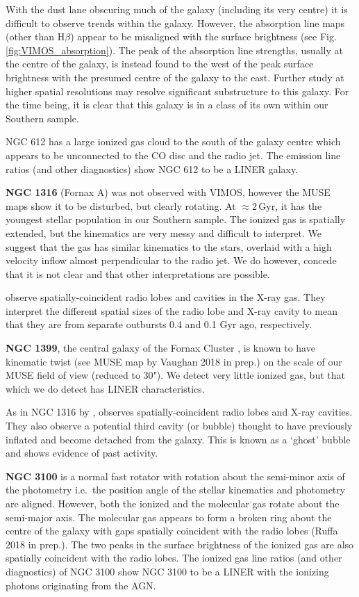 With the dust lane obscuring much of the galaxy (including its very centre) it is difficult to observe trends within the galaxy. However, the absorption line maps (other than H$\beta$) appear to be misaligned with the surface brightness (see Fig.\,\ref{fig:VIMOS_absorption}). The peak of the absorption line strengths, usually at the centre of the galaxy, is instead found to the west of the peak surface brightness with the presumed centre of the galaxy to the east. Further study at higher spatial resolutions may resolve significant substructure to this galaxy. For the time being, it is clear that this galaxy is in a class of its own within our Southern sample. 

NGC 612 has a large ionized gas cloud to the south of the galaxy centre which appears to be unconnected to the CO disc and the radio jet. The emission line ratios (and other diagnostics) show NGC 612 to be a LINER galaxy. 

\textbf{NGC 1316} (Fornax A) was not observed with VIMOS, however the MUSE maps show it to be disturbed, but clearly rotating. At $\approx 2$\,Gyr, it has the youngest stellar population in our Southern sample. The ionized gas is spatially extended, but the kinematics are very messy and difficult to interpret. We suggest that the gas has similar kinematics to the stars, overlaid with a high velocity inflow almost perpendicular to the radio jet. We do however, concede that it is not clear and that other interpretations are possible. 

\citet{Lanz2010} observe spatially-coincident radio lobes and cavities in the X-ray gas. They interpret the different spatial sizes of the radio lobe and X-ray cavity to mean that they are from separate outbursts 0.4 and 0.1 Gyr ago, respectively.

\textbf{NGC 1399}, the central galaxy of the Fornax Cluster \citep{Jordan2007}, is known to have kinematic twist (see MUSE map by Vaughan 2018 in prep.) on the scale of our MUSE field of view (reduced to 30"). We detect very little ionized gas, but that which we do detect has LINER characteristics. 

As in NGC 1316 by \citet{Lanz2010}, \citet{Su2017} observes spatially-coincident radio lobes and X-ray cavities. They also observe a potential third cavity (or bubble) thought to have previously inflated and become detached from the galaxy. This is known as a `ghost' bubble and shows evidence of past activity.

\textbf{NGC 3100} is a normal fast rotator with rotation about the semi-minor axis of the photometry i.e.\ the position angle of the stellar kinematics and photometry are aligned. However, both the ionized and the molecular gas rotate about the semi-major axis. The molecular gas appears to form a broken ring about the centre of the galaxy with gaps spatially coincident with the radio lobes (Ruffa 2018 in prep.). The two peaks in the surface brightness of the ionized gas are also spatially coincident with the radio lobes. The ionized gas line ratios (and other diagnostics) of NGC 3100 show NGC 3100 to be a LINER with the ionizing photons originating from the AGN.

